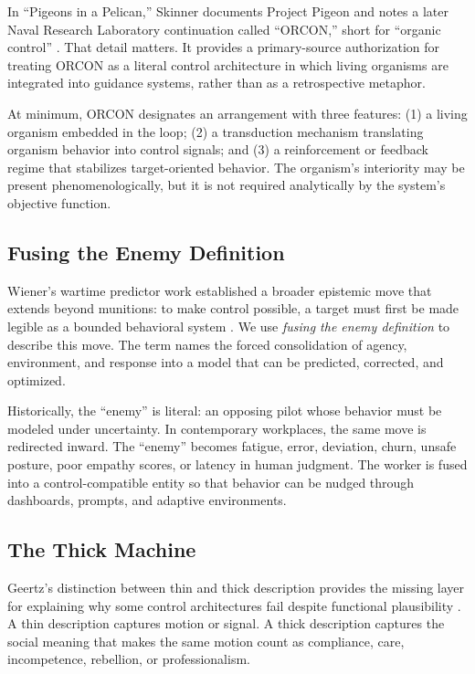 \documentclass[runningheads]{llncs}
\begin{document}
In ``Pigeons in a Pelican,'' Skinner documents Project Pigeon and notes a later Naval Research Laboratory continuation called ``ORCON,'' short for ``organic control'' \cite{skinner1960pigeons}. That detail matters. It provides a primary-source authorization for treating ORCON as a literal control architecture in which living organisms are integrated into guidance systems, rather than as a retrospective metaphor.

At minimum, ORCON designates an arrangement with three features: (1) a living organism embedded in the loop; (2) a transduction mechanism translating organism behavior into control signals; and (3) a reinforcement or feedback regime that stabilizes target-oriented behavior. The organism's interiority may be present phenomenologically, but it is not required analytically by the system's objective function.

\subsection{Fusing the Enemy Definition}

Wiener's wartime predictor work established a broader epistemic move that extends beyond munitions: to make control possible, a target must first be made legible as a bounded behavioral system \cite{wiener1948cybernetics}. We use \emph{fusing the enemy definition} to describe this move. The term names the forced consolidation of agency, environment, and response into a model that can be predicted, corrected, and optimized.

Historically, the ``enemy'' is literal: an opposing pilot whose behavior must be modeled under uncertainty. In contemporary workplaces, the same move is redirected inward. The ``enemy'' becomes fatigue, error, deviation, churn, unsafe posture, poor empathy scores, or latency in human judgment. The worker is fused into a control-compatible entity so that behavior can be nudged through dashboards, prompts, and adaptive environments.

\subsection{The Thick Machine}

Geertz's distinction between thin and thick description provides the missing layer for explaining why some control architectures fail despite functional plausibility \cite{geertz1973interpretation}. A thin description captures motion or signal. A thick description captures the social meaning that makes the same motion count as compliance, care, incompetence, rebellion, or professionalism.
\end{document}

